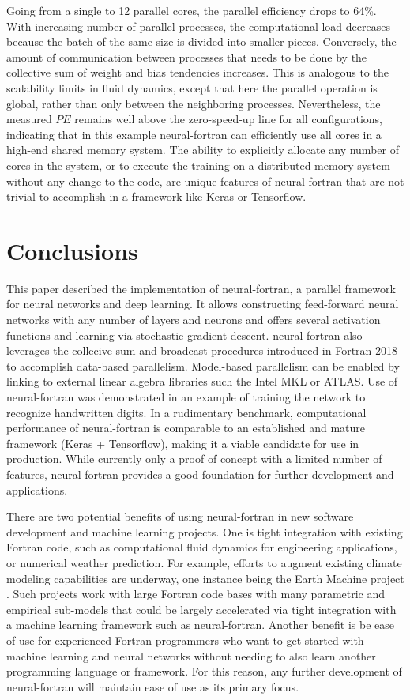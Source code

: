 \documentclass[sigplan, review=false, screen=true, balance=true]{acmart}
\begin{document}
Going from a single to 12 parallel cores, the parallel efficiency drops
to 64\%. With increasing number of parallel processes, the computational
load decreases because the batch of the same size is divided into smaller pieces.
Conversely, the amount of communication between processes that needs to be
done by the collective sum of weight and bias tendencies increases. This is
analogous to the scalability limits in fluid dynamics, except that here the
parallel operation is global, rather than only between the neighboring
processes. 
Nevertheless, the measured $PE$ remains well above the zero-speed-up line
for all configurations, indicating that in this example neural-fortran
can efficiently use all cores in a high-end shared memory system.
The ability to explicitly allocate any number
of cores in the system, or to execute the training on a distributed-memory
system without any change to the code, are unique features of neural-fortran
that are not trivial to accomplish in a framework like Keras or Tensorflow.

\section{Conclusions} \label{section_conclusions}

This paper described the implementation of neural-fortran, a parallel framework
for neural networks and deep learning. It allows constructing feed-forward
neural networks with any number of layers and neurons and offers several
activation functions and learning via stochastic gradient descent.
neural-fortran also leverages the collecive sum and broadcast procedures
introduced in Fortran 2018 to accomplish data-based parallelism.
Model-based parallelism can be enabled by linking to external linear algebra
libraries such the Intel MKL or ATLAS. Use of neural-fortran was demonstrated
in an example of training the network to recognize handwritten digits.
In a rudimentary benchmark, computational performance of neural-fortran is
comparable to an established and mature framework (Keras + Tensorflow),
making it a viable candidate for use in production.
While currently only a proof of concept with a limited number of features,
neural-fortran provides a good foundation for further development and
applications.

There are two potential benefits of using neural-fortran in new
software development and machine learning projects.
One is tight integration with existing Fortran code, such as computational
fluid dynamics for engineering applications, or numerical weather prediction.
For example, efforts to augment existing climate modeling capabilities are underway,
one instance being the Earth Machine project \citep{schneider17, voosen18}.
Such projects work with large Fortran code bases with many parametric and
empirical sub-models that could be largely accelerated via tight integration
with a machine learning framework such as neural-fortran.
Another benefit is be ease of use for experienced Fortran programmers who
want to get started with machine learning and neural networks without needing
to also learn another programming language or framework. For this reason, any
further development of neural-fortran will maintain ease of use as its primary
focus.
\end{document}
